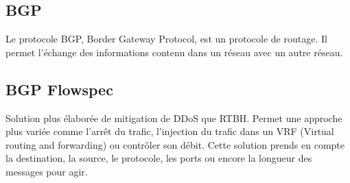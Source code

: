 \subsection{BGP}
\label{sec:BGP}

Le protocole BGP, Border Gateway Protocol, est un protocole de routage. Il permet l'échange des informations contenu dans un réseau avec un autre réseau.


\subsection{BGP Flowspec}
Solution plus élaborée de mitigation de DDoS que RTBH.
Permet une approche plus variée comme l'arrêt du trafic, l'injection du trafic dans un VRF (Virtual routing and forwarding) ou contrôler son débit. Cette solution prends en compte la destination, la source, le protocole, les ports ou encore la longueur des messages pour agir.
